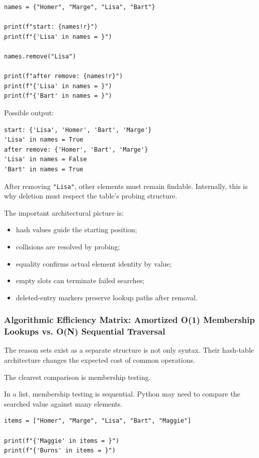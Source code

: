 \begin{verbatim}
names = {"Homer", "Marge", "Lisa", "Bart"}

print(f"start: {names!r}")
print(f"{'Lisa' in names = }")

names.remove("Lisa")

print(f"after remove: {names!r}")
print(f"{'Lisa' in names = }")
print(f"{'Bart' in names = }")
\end{verbatim}

Possible output:

\begin{verbatim}
start: {'Lisa', 'Homer', 'Bart', 'Marge'}
'Lisa' in names = True
after remove: {'Homer', 'Bart', 'Marge'}
'Lisa' in names = False
'Bart' in names = True
\end{verbatim}

After removing \texttt{"Lisa"}, other elements must remain findable. Internally, this is why deletion must respect the table's probing structure.

The important architectural picture is:

\begin{itemize}
    \item hash values guide the starting position;
    \item collisions are resolved by probing;
    \item equality confirms actual element identity by value;
    \item empty slots can terminate failed searches;
    \item deleted-entry markers preserve lookup paths after removal.
\end{itemize}

\subsubsection{Algorithmic Efficiency Matrix: Amortized O(1) Membership Lookups vs. O(N) Sequential Traversal}

The reason sets exist as a separate structure is not only syntax. Their hash-table architecture changes the expected cost of common operations.

The clearest comparison is membership testing.

In a list, membership testing is sequential. Python may need to compare the searched value against many elements.

\begin{verbatim}
items = ["Homer", "Marge", "Lisa", "Bart", "Maggie"]

print(f"{'Maggie' in items = }")
print(f"{'Burns' in items = }")
\end{verbatim}

